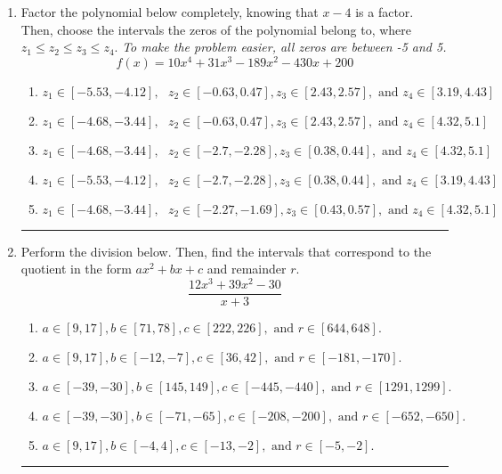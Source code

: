 \documentclass[14pt]{extbook}
\newcommand{\litem}[1]{\item#1\hspace*{-1cm}\rule{\textwidth}{0.4pt}}
\begin{document}
\begin{enumerate}
{\begin{enumerate}[label=\Alph*.]
\end{enumerate} }
\litem{
Factor the polynomial below completely, knowing that $x-4$ is a factor. Then, choose the intervals the zeros of the polynomial belong to, where $z_1 \leq z_2 \leq z_3 \leq z_4$. \textit{To make the problem easier, all zeros are between -5 and 5.}\[ f(x) = 10x^{4} +31 x^{3} -189 x^{2} -430 x + 200 \]\begin{enumerate}[label=\Alph*.]
\item \( z_1 \in [-5.53, -4.12], \text{   }  z_2 \in [-0.63, 0.47], z_3 \in [2.43, 2.57], \text{   and   } z_4 \in [3.19, 4.43] \)
\item \( z_1 \in [-4.68, -3.44], \text{   }  z_2 \in [-0.63, 0.47], z_3 \in [2.43, 2.57], \text{   and   } z_4 \in [4.32, 5.1] \)
\item \( z_1 \in [-4.68, -3.44], \text{   }  z_2 \in [-2.7, -2.28], z_3 \in [0.38, 0.44], \text{   and   } z_4 \in [4.32, 5.1] \)
\item \( z_1 \in [-5.53, -4.12], \text{   }  z_2 \in [-2.7, -2.28], z_3 \in [0.38, 0.44], \text{   and   } z_4 \in [3.19, 4.43] \)
\item \( z_1 \in [-4.68, -3.44], \text{   }  z_2 \in [-2.27, -1.69], z_3 \in [0.43, 0.57], \text{   and   } z_4 \in [4.32, 5.1] \)

\end{enumerate} }
\litem{
Perform the division below. Then, find the intervals that correspond to the quotient in the form $ax^2+bx+c$ and remainder $r$.\[ \frac{12x^{3} +39 x^{2} -30}{x + 3} \]\begin{enumerate}[label=\Alph*.]
\item \( a \in [9, 17], b \in [71, 78], c \in [222, 226], \text{ and } r \in [644, 648]. \)
\item \( a \in [9, 17], b \in [-12, -7], c \in [36, 42], \text{ and } r \in [-181, -170]. \)
\item \( a \in [-39, -30], b \in [145, 149], c \in [-445, -440], \text{ and } r \in [1291, 1299]. \)
\item \( a \in [-39, -30], b \in [-71, -65], c \in [-208, -200], \text{ and } r \in [-652, -650]. \)
\item \( a \in [9, 17], b \in [-4, 4], c \in [-13, -2], \text{ and } r \in [-5, -2]. \)


\end{enumerate}}
\end{enumerate}
\end{document}
